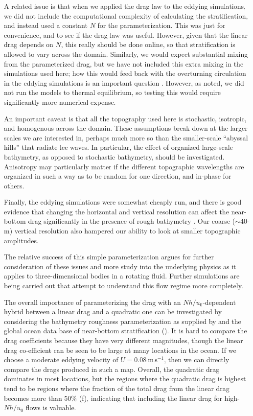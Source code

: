 \documentclass[twocol]{ametsocV5}
\begin{document}
A related issue is that when we applied the drag law to the eddying simulations, we did not include the computational complexity of calculating the stratification, and instead used a constant $N$ for the parameterization.  This was just for convenience, and to see if the drag law was useful.  However, given that the linear drag depends on $N$, this really should be done online, so that stratification is allowed to vary across the domain.   Similarly, we would expect substantial mixing from the parameterized drag, but we have not included this extra mixing in the simulations used here; how this would feed back with the overturning circulation in the eddying simulations is an important question \citep{broadbridgeetal16}. However, as noted, we did not run the models to thermal equilibrium, so testing this would require significantly more numerical expense.

An important caveat is that all the topography used here is stochastic, isotropic, and homogenous across the domain.   These assumptions break down at the larger scales we are interested in, perhaps much more so than the smaller-scale ``abyssal hills''  that radiate lee waves.  In particular, the effect of organized large-scale bathymetry, as opposed to stochastic bathymetry, should be investigated.  Anisotropy may particularly matter if the different topographic wavelengths are organized in such a way as to be random for one direction, and in-phase for others.

Finally, the eddying simulations were somewhat cheaply run, and there is good evidence that changing the horizontal and vertical resolution can affect the near-bottom drag significantly in the presence of rough bathymetry \citep{klymak18}.  Our coarse ($\sim$40-m) vertical resolution also hampered our ability to look at smaller  topographic amplitudes.

The relative success of this simple parameterization argues for further consideration of these issues and more study into the underlying physics as it applies to three-dimensional bodies in a rotating fluid.  Further simulations are being carried out that attempt to understand this flow regime more completely.  

The overall importance of parameterizing the drag with an $Nh/u_0$-dependent hybrid between a linear drag and a quadratic one can be investigated by considering the bathymetry roughness parameterization as supplied by \citep{goffarbic10} and the global ocean data base of near-bottom stratification ().  It is hard to compare the drag coefficients because they have very different magnitudes, though the linear drag co-efficient can be seen to be large at many locations in the ocean.  If we choose a moderate eddying velocity of $U=0.08\ \mathrm{m\,s^{-1}}$, then we can directly compare the drags produced in such a map.  Overall, the quadratic drag dominates in most locations, but the regions where the quadratic drag is highest tend to be regions where the fraction of the total drag from the linear drag becomes more than 50\% (f), indicating that including the linear drag for high-$Nh/u_0$ flows is valuable.
\end{document}
